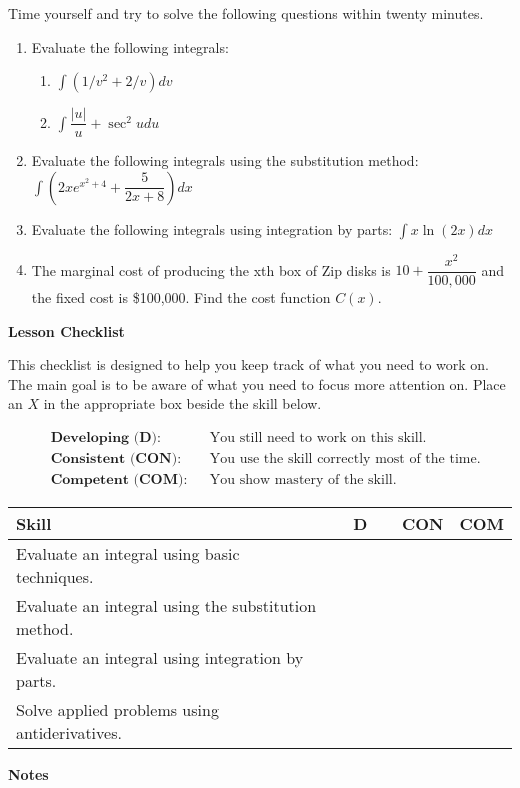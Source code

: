 \documentclass[10pt]{book}
\theoremstyle{definition}
\theoremstyle{remark}
\begin{document}
\begin{large}
\noindent
Time yourself and try to solve the following questions within twenty minutes. 
\begin{enumerate}
\item Evaluate the following integrals:
\begin{enumerate}
	\item $\displaystyle \int \left(1/v^2 + 2/v\right) dv$     \vfil
	\item $\displaystyle \int \dfrac{|u|}{u} + \sec^2 u du$   \vfil  
\end{enumerate}
\item Evaluate the following integrals using the substitution method: $\displaystyle \int \left(2xe^{x^2 + 4} + \dfrac{5}{2x+8}  \right) dx$\vfil
\item Evaluate the following integrals using integration by parts: $\displaystyle \int x\ln(2x) dx$\vfil
\item The marginal cost of producing the xth box of Zip disks is $10 + \dfrac{x^2}{100,000}$ and the fixed cost is \$100,000. Find the cost function $C(x)$.\vfil
\end{enumerate}

\noindent
\textbf{Lesson Checklist}
\bigskip

\noindent
This checklist is designed to help you keep track of what you need to work on. The main goal is to be aware of what you need to focus more attention on. Place an $X$ in the appropriate box beside the skill below. 
\bigskip

\noindent
\begin{align*}
&\textbf{Developing (D):} &&\textrm{You still need to work on this skill.}\\
&\textbf{Consistent (CON):} &&\textrm{You use the skill correctly most of the time.}\\
&\textbf{Competent (COM):} &&\textrm{You show mastery of the skill.} 
\end{align*}
\vfil

\begin{center}
\begin{tabular}{|l|l|l|l|}
\hline
\textbf{Skill} & \textbf{~~D~~} & \textbf{CON} & \textbf{COM} \\
\hline
Evaluate an integral using basic techniques.&&&\\
\hline
Evaluate an integral using the substitution method.&&&\\
\hline
Evaluate an integral using integration by parts.&&&\\
\hline
Solve applied problems using antiderivatives.&&&\\
\hline
\end{tabular}
\end{center}
\vfil

\noindent
\textbf{Notes}
\end{large} \vfil
\newpage
\end{document}
